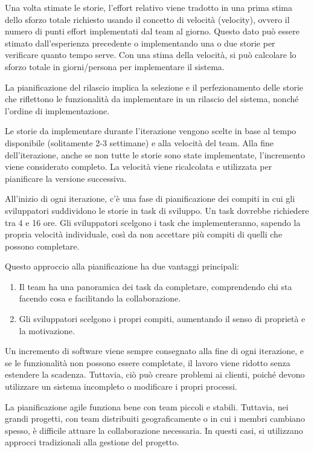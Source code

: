 Una volta stimate le storie, l'effort relativo viene tradotto in una prima stima dello sforzo totale richiesto usando il concetto di velocità (velocity), ovvero il numero di punti effort implementati dal team al giorno. Questo dato può essere stimato dall'esperienza precedente o implementando una o due storie per verificare quanto tempo serve. Con una stima della velocità, si può calcolare lo sforzo totale in giorni/persona per implementare il sistema.

La pianificazione del rilascio implica la selezione e il perfezionamento delle storie che riflettono le funzionalità da implementare in un rilascio del sistema, nonché l'ordine di implementazione.

Le storie da implementare durante l'iterazione vengono scelte in base al tempo disponibile (solitamente 2-3 settimane) e alla velocità del team. Alla fine dell'iterazione, anche se non tutte le storie sono state implementate, l'incremento viene considerato completo. La velocità viene ricalcolata e utilizzata per pianificare la versione successiva.

All'inizio di ogni iterazione, c'è una fase di pianificazione dei compiti in cui gli sviluppatori suddividono le storie in task di sviluppo. Un task dovrebbe richiedere tra 4 e 16 ore. Gli sviluppatori scelgono i task che implementeranno, sapendo la propria velocità individuale, così da non accettare più compiti di quelli che possono completare.

Questo approccio alla pianificazione ha due vantaggi principali:
\begin{enumerate}
    \item Il team ha una panoramica dei task da completare, comprendendo chi sta facendo cosa e facilitando la collaborazione.
    \item Gli sviluppatori scelgono i propri compiti, aumentando il senso di proprietà e la motivazione.
\end{enumerate}
Un incremento di software viene sempre consegnato alla fine di ogni iterazione, e se le funzionalità non possono essere completate, il lavoro viene ridotto senza estendere la scadenza. Tuttavia, ciò può creare problemi ai clienti, poiché devono utilizzare un sistema incompleto o modificare i propri processi.

La pianificazione agile funziona bene con team piccoli e stabili. Tuttavia, nei grandi progetti, con team distribuiti geograficamente o in cui i membri cambiano spesso, è difficile attuare la collaborazione necessaria. In questi casi, si utilizzano approcci tradizionali alla gestione del progetto.

